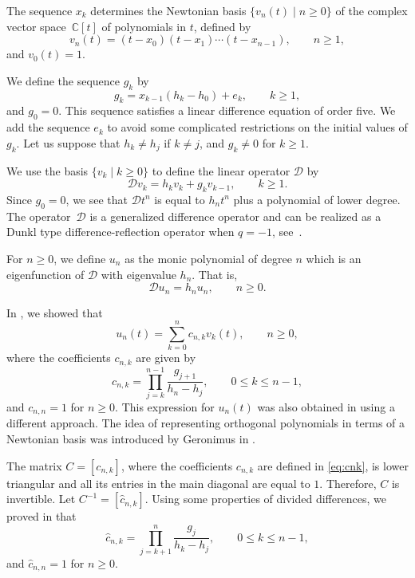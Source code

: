 \documentclass[pdftex]{sigma}
\def\cD{\mathcal D}
\def\hc{\hat c}
\numberwithin{equation}{section}
\begin{document}
The sequence $x_k$ determines the Newtonian basis $\{v_n(t) \mid n\ge 0\}$
of the complex vector space~${\mathbb C}[t]$ of polynomials in $t$, defined by
\begin{equation}\label{eq:Newton}
	v_n(t)= (t-x_0)(t-x_1)\cdots (t-x_{n-1}), \qquad n \ge 1,
\end{equation}
and $v_0(t)=1$.

We define the sequence $g_k$ by
\begin{equation*} %
g_k= x_{k-1} (h_k- h_0) + e_k, \qquad k \ge 1,
\end{equation*}
and $g_0=0$.
This sequence satisfies a linear difference equation of order five. We add the sequence $e_k$ to avoid some complicated restrictions on the initial values of $g_k$. Let us suppose that $h_k \ne h_j$ if $k \ne j$, and $g_k \ne 0$ for $k \ge 1$.

We use the basis $\{v_k\mid k \ge 0\}$ to define the linear operator $\cD$ by
\begin{equation*}%
\cD v_k = h_k v_k + g_k v_{k-1}, \qquad k \ge 1.
\end{equation*}
	Since $g_0=0 $, we see that $\cD t^n$ is equal to $ h_n t^n $ plus a polynomial of lower degree.
The operator~$\cD$ is a generalized difference operator and can be realized
as a Dunkl type difference-reflection operator when $q=-1$, see~\cite{GenVZ2}.

	For $n \ge 0$, we define $u_n$ as the monic polynomial of degree $n$ which is an eigenfunction of $\cD$ with eigenvalue $h_n$. That is,
\begin{equation}\label{eq:eigenEq}
\cD u_n = h_n u_n, \qquad n \ge 0.
\end{equation}

 In \cite[p.~249]{Uni}, we showed that
\begin{equation*}%
 u_n(t) = \sum_{k=0}^n c_{n,k} v_k(t), \qquad n \ge 0,
\end{equation*}
 where the coefficients $ c_{n,k}$ are given by
 \begin{equation}\label{eq:cnk}
c_{n,k}=\prod_{j=k}^{n-1} \frac{g_{j+1}}{h_n -h_j}, \qquad 0 \le k \le n-1,
 \end{equation}
and $c_{n,n}=1$ for $n \ge 0$.
This expression for $u_n(t)$ was also obtained in \cite{VZ} using a different approach. The idea of representing orthogonal polynomials in terms of a Newtonian basis was introduced by Geronimus in \cite{Ger}.

The matrix $C=[c_{n,k}]$, where the coefficients $c_{n,k}$ are defined in \eqref{eq:cnk}, is lower triangular and all its entries in the main diagonal are equal to $1$. Therefore, $C$ is invertible.  Let $ C^{-1}=[{\hat c}_{n,k}]$. Using some properties of divided differences, we proved in \cite[p.~251]{Uni} that
\begin{equation*}%
  \hc_{n,k}=\prod_{j=k+1}^n \frac{g_j}{h_k - h_j}, \qquad 0 \le k \le n-1,
\end{equation*}
   and $\hc_{n,n}=1$ for $n \ge 0.$
\end{document}
